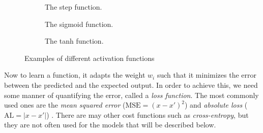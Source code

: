 \begin{figure}[h]
  \begin{subfigure}[b]{0.32\textwidth}
    \centering
    \caption{The step function.}
  \end{subfigure}
  \begin{subfigure}[b]{0.32\textwidth}
    \centering
    \caption{The sigmoid function.}
  \end{subfigure}
  \begin{subfigure}[b]{0.32\textwidth}
    \centering
    \caption{The tanh function.}
  \end{subfigure}
  \caption{Examples of different activation functions}

\label{fig:activation-functions}
\end{figure}

Now to learn a function, it adapts the weight $w_i$ such that it minimizes the error between the predicted and the expected output.
In order to achieve this, we need some manner of quantifying the error, called a \textit{loss function}.
The most commonly used ones are the \textit{mean squared error} ($\text{MSE} = (x - x')^2$) and \textit{absolute loss} ($\text{AL} = | x - x' |$) \cite{nielsen_2017}.
There are may other cost functions such as \textit{cross-entropy}, but they are not often used for the models that will be described below.

